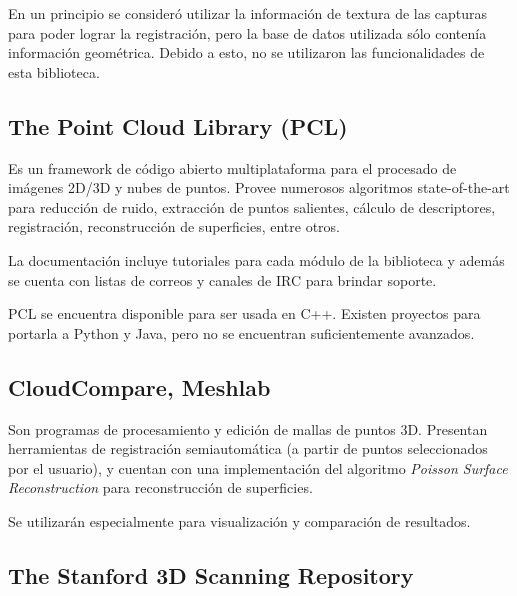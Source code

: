 			En un principio se consideró utilizar la información de textura de
			las capturas para poder lograr la registración, pero la base de
			datos utilizada sólo contenía información geométrica.
			Debido a esto, no se utilizaron las funcionalidades de esta biblioteca.


		\subsection{The Point Cloud Library (PCL)}

			Es un framework de código abierto multiplataforma para el procesado de imágenes 2D/3D y nubes de puntos.
			Provee numerosos algoritmos state-of-the-art %
			para reducción de ruido, extracción de puntos salientes,
			cálculo de descriptores, registración,
			reconstrucción de superficies, entre otros.

			La documentación incluye tutoriales para cada módulo de la biblioteca
			y además se cuenta con listas de correos
			y canales de IRC para brindar soporte.


			PCL se encuentra disponible para ser usada en C++.
			Existen proyectos para portarla a Python y Java,
			pero no se encuentran suficientemente avanzados.

		\subsection{CloudCompare, Meshlab}
			Son programas de procesamiento y edición de mallas de puntos 3D.
			Presentan herramientas de registración semiautomática (a partir de
			puntos seleccionados por el usuario), y cuentan con una
			implementación del algoritmo \emph{Poisson Surface Reconstruction}
			para reconstrucción de superficies.

			Se utilizarán especialmente para visualización
			y comparación de resultados.

		\subsection{The Stanford 3D Scanning Repository}

